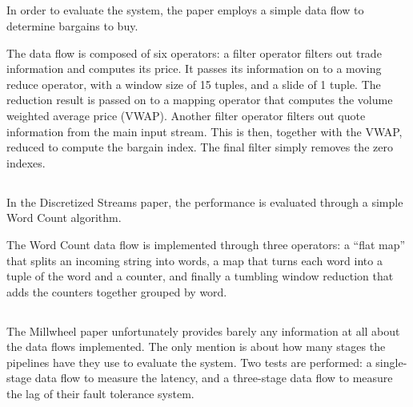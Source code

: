 \subsection{}
In order to evaluate the system, the paper\cite{spade} employs a simple data flow to determine bargains to buy. \\


The data flow is composed of six operators: a filter operator filters out trade information and computes its price. It passes its information on to a moving reduce operator, with a window size of 15 tuples, and a slide of 1 tuple. The reduction result is passed on to a mapping operator that computes the volume weighted average price (VWAP). Another filter operator filters out quote information from the main input stream. This is then, together with the VWAP, reduced to compute the bargain index. The final filter simply removes the zero indexes.

\subsection{}
In the Discretized Streams paper\cite{discretized}, the performance is evaluated through a simple Word Count algorithm. \\


The Word Count data flow is implemented through three operators: a ``flat map'' that splits an incoming string into words, a map that turns each word into a tuple of the word and a counter, and finally a tumbling window reduction that adds the counters together grouped by word.

\subsection{}
The Millwheel paper\cite{millwheel} unfortunately provides barely any information at all about the data flows implemented. The only mention is about how many stages the pipelines have they use to evaluate the system. Two tests are performed: a single-stage data flow to measure the latency, and a three-stage data flow to measure the lag of their fault tolerance system.

